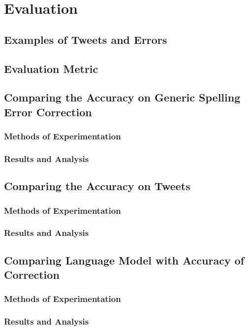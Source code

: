 \chapter{Evaluation}

\section{Examples of Tweets and Errors}

\section{Evaluation Metric}

\section{Comparing the Accuracy on Generic Spelling Error Correction}
\subsection{Methods of Experimentation}
\subsection{Results and Analysis}

\section{Comparing the Accuracy on Tweets}
\subsection{Methods of Experimentation}
\subsection{Results and Analysis}

\section{Comparing Language Model with Accuracy of Correction}
\subsection{Methods of Experimentation}
\subsection{Results and Analysis}

